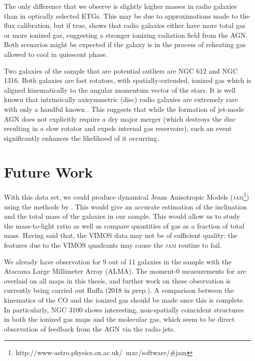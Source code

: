 The only difference that we observe is slightly higher  masses in radio galaxies than in optically selected ETGs. This may be due to approximations made to the flux calibration, but if true, shows that radio galaxies either have more total gas or more ionized gas, suggesting a stronger ionizing radiation field from the AGN. Both scenarios might be expected if the galaxy is in the process of reheating gas allowed to cool in quiescent phase. 

Two galaxies of the sample that are potential outliers are NGC 612 and NGC 1316. Both galaxies are fast rotators, with spatially-extended, ionized gas which is aligned kinematically to the angular momentum vector of the stars. It is well known that intrinsically axisymmetric (disc) radio galaxies are extremely rare with only a handful known \citep[e.g.][]{Heckman1982, Ledlow1998, Hota2011a, Morganti2011, Mao2015}. This suggests that while the formation of jet-mode AGN does not explicitly require a dry major merger (which destroys the disc resulting in a slow rotator and expels internal gas reservoirs), such an event significantly enhances the likelihood of it occurring. 

\section{Future Work}
	\label{sec:future}
	With this data set, we could produce dynamical Jeans Anisotropic Models (\textsc{jam}\footnote{http://www-astro.physics.ox.ac.uk/~mxc/software/\#jam}) using the methods by \citet{Cappellari2008}. This would give an accurate estimation of the inclination and the total mass of the galaxies in our sample. This would allow us to study the mass-to-light ratio as well as compare quantities of gas as a fraction of total mass. Having said that, the VIMOS data may not be of sufficient quality: the features due to the VIMOS quadrants may cause the \textsc{jam} routine to fail. 

	We already have observation for 9 out of 11 galaxies in the sample with the Atacama Large Millimeter Array (ALMA). The moment-0 measurements for  are overlaid on all maps in this thesis, and further work on these observation is currently being carried out Ruffa (2018 in prep.). A comparison between the kinematics of the CO and the ionized gas should be made once this is complete. In particularly, NGC 3100 shows interesting, non-spatially coincident structures in both the ionized gas maps and the molecular gas, which seem to be direct observation of feedback from the AGN via the radio jets. 

